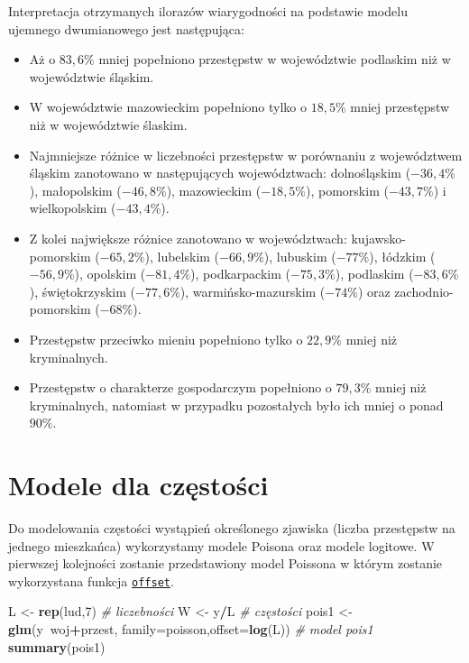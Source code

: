 \documentclass[polish,]{book}
\newenvironment{Shaded}{\begin{snugshade}}{\end{snugshade}}
\newcommand{\CommentTok}[1]{\textcolor[rgb]{0.56,0.35,0.01}{\textit{#1}}}
\newcommand{\DataTypeTok}[1]{\textcolor[rgb]{0.13,0.29,0.53}{#1}}
\newcommand{\DecValTok}[1]{\textcolor[rgb]{0.00,0.00,0.81}{#1}}
\newcommand{\KeywordTok}[1]{\textcolor[rgb]{0.13,0.29,0.53}{\textbf{#1}}}
\newcommand{\NormalTok}[1]{#1}
\newcommand{\OperatorTok}[1]{\textcolor[rgb]{0.81,0.36,0.00}{\textbf{#1}}}
\newcommand{\StringTok}[1]{\textcolor[rgb]{0.31,0.60,0.02}{#1}}
\begin{document}
Interpretacja otrzymanych ilorazów wiarygodności na podstawie modelu ujemnego
dwumianowego jest następująca:

\begin{itemize}
\item
  Aż o \(83,6\%\) mniej popełniono przestępstw w województwie podlaskim niż w
  województwie śląskim.
\item
  W województwie mazowieckim popełniono tylko o \(18,5\%\) mniej przestępstw
  niż w województwie ślaskim.
\item
  Najmniejsze różnice w liczebności przestępstw w porównaniu z województwem
  śląskim zanotowano w następujących województwach: dolnośląskim (\(-36,4\%\)),
  małopolskim (\(-46,8\%\)), mazowieckim (\(-18,5\%\)), pomorskim (\(-43,7\%\)) i wielkopolskim (\(-43,4\%\)).
\item
  Z kolei największe różnice zanotowano w województwach: kujawsko-pomorskim
  (\(-65,2\%\)), lubelskim (\(-66,9\%\)), lubuskim (\(-77\%\)), łódzkim (\(-56,9\%\)), opolskim (\(-81,4\%\)), podkarpackim (\(-75,3\%\)), podlaskim (\(-83,6\%\)), świętokrzyskim (\(-77,6\%\)), warmińsko-mazurskim (\(-74\%\)) oraz zachodnio-pomorskim (\(-68\%\)).
\item
  Przestępstw przeciwko mieniu popełniono tylko o \(22,9\%\) mniej niż kryminalnych.
\item
  Przestępstw o charakterze gospodarczym popełniono o \(79,3\%\) mniej niż kryminalnych, natomiast w przypadku pozostałych było ich mniej o ponad \(90\%\).
\end{itemize}

\hypertarget{part_12.5}{%
\section{Modele dla częstości}\label{part_12.5}}

Do modelowania częstości wystąpień określonego zjawiska (liczba przestępstw na jednego mieszkańca) wykorzystamy modele Poisona oraz modele logitowe. W pierwszej
kolejności zostanie przedstawiony model Poissona w którym zostanie wykorzystana
funkcja \href{https://rdrr.io/r/stats/offset.html}{\texttt{offset}}.

\begin{Shaded}
\begin{Highlighting}[]
\NormalTok{L <-}\StringTok{ }\KeywordTok{rep}\NormalTok{(lud,}\DecValTok{7}\NormalTok{) }\CommentTok{# liczebności}
\NormalTok{W <-}\StringTok{ }\NormalTok{y}\OperatorTok{/}\NormalTok{L      }\CommentTok{# częstości}
\NormalTok{pois1 <-}\StringTok{ }\KeywordTok{glm}\NormalTok{(y}\OperatorTok{~}\NormalTok{woj}\OperatorTok{+}\NormalTok{przest, }\DataTypeTok{family=}\NormalTok{poisson,}\DataTypeTok{offset=}\KeywordTok{log}\NormalTok{(L)) }\CommentTok{# model pois1}
\KeywordTok{summary}\NormalTok{(pois1)}
\end{Highlighting}
\end{Shaded}
\end{document}
